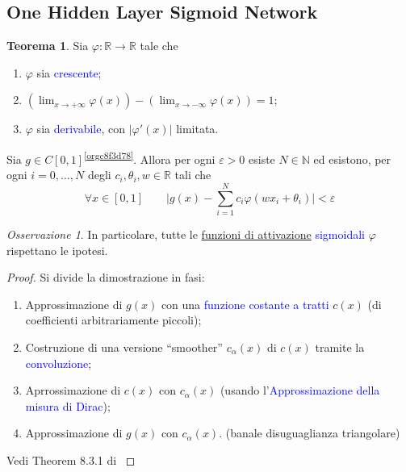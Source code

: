 \documentclass[10pt]{book}
\newcommand{\1}{\mathds{1}}
\newcommand{\R}{\mathds{R}}
\newcommand{\N}{\mathds{N}}
\theoremstyle{definition}%
\newtheorem{thm}{Teorema}[section]
\theoremstyle{plain}
\theoremstyle{remark}
\newtheorem*{oss}{Osservazione}
\renewcommand{\href}[2]{\textcolor{blue}{#2}}
\begin{document}
\subsection{One Hidden Layer Sigmoid Network}
\label{sec:org00d548e}

\begin{thm}
Sia \(\varphi:\R\to \R\) tale che
\begin{enumerate}
\item \(\varphi\) sia \href{../../../../../org/roam/20250203132953-funzione_monotona.org}{crescente};
\item \((\lim_{x\to+\infty}\varphi(x))-(\lim_{x\to-\infty}\varphi(x)) = 1\);
\item \(\varphi\) sia \href{../../../../../org/roam/20250627155431-funzione_derivabile.org}{derivabile}, con \(|\varphi'(x)|\) limitata.
\end{enumerate}

Sia \(g \in C[0,1]\)\textsuperscript{\ref{orgc8f3d78}}. Allora per ogni \(\varepsilon>0\) esiste \(N \in \N\) ed esistono, per ogni \(i=0,\dots,N\) degli \(c_{i}, \theta_{i}, w \in \R\) tali che
\begin{equation*}
\forall  x \in [0,1]\qquad \bigg\lvert g(x) - \sum_{i=1}^{N} c_{i}\varphi(wx_{i} + \theta_{i})\bigg\rvert <\varepsilon
\end{equation*}
\end{thm}

\begin{oss}
In particolare, tutte le \hyperref[sec:orgeed12bd]{funzioni di attivazione} \href{../../../../../org/roam/20250625110110-funzione_sigmoidale.org}{sigmoidali} \(\varphi\) rispettano le ipotesi.
\end{oss}

\begin{proof}
Si divide la dimostrazione in fasi:
\begin{enumerate}
\item Approssimazione di \(g(x)\) con una \href{../../../../../org/roam/20250701140621-funzione_costante_a_tratti.org}{funzione costante a tratti} \(c(x)\) (di coefficienti arbitrariamente piccoli);
\item Costruzione di una versione ``smoother'' \(c_{\alpha}(x)\) di \(c(x)\) tramite la \href{../../../../../org/roam/20250703105424-prodotto_di_convoluzione.org}{convoluzione};
\item Aprrossimazione di \(c(x)\) con \(c_{\alpha}(x)\) (usando l'\href{../../../../../org/roam/20250630155139-misura_di_dirac_approssimata_da_misure_a_campana.org}{Approssimazione della misura di Dirac});
\item Approssimazione di \(g(x)\) con \(c_{\alpha}(x)\). (banale disuguaglianza triangolare)
\end{enumerate}

Vedi Theorem 8.3.1 di \cite{calinDeepLearningArchitectures2020}
\end{proof}
\end{document}
